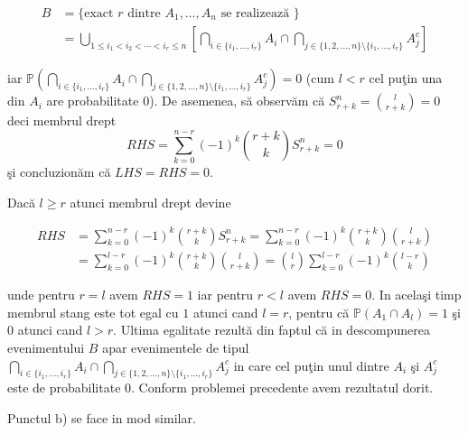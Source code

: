 \documentclass[]{article}
\def\PP{{\mathbb P}}
\begin{document}
\begin{align*}
  B &= \{\mbox{exact $r$ dintre $A_1,\dots, A_n$ se realizeaz\u a }\}\\
  &= \bigcup_{1\leq i_1<i_2<\cdots<i_r\leq n}\left[\bigcap_{i\in\{i_1,\dots,i_r\}}A_i\cap\bigcap_{j\in\{1,2,\dots,n\}\setminus\{i_1,\dots,i_r\}}A_j^c\right]
\end{align*}

iar
\(\PP\left(\bigcap_{i\in\{i_1,\dots,i_r\}}A_i\cap\bigcap_{j\in\{1,2,\dots,n\}\setminus\{i_1,\dots,i_r\}}A_j^c\right)=0\)
(cum \(l<r\) cel pu\c tin una din \(A_i\) are probabilitate \(0\)). De
asemenea, s\u a observ\u am c\u a \(S_{r+k}^{n}=\binom{l}{r+k}=0\) deci
membrul drept \[
  RHS=\displaystyle\sum_{k=0}^{n-r}(-1)^k\binom{r+k}{k}S_{r+k}^{n}=0
\] \c si concluzion\u am c\u a \(LHS=RHS=0\).

Dac\u a \(l\geq r\) atunci membrul drept devine

\begin{align*}
  RHS &= \displaystyle\sum_{k=0}^{n-r}(-1)^k\binom{r+k}{k}S_{r+k}^{n} = \displaystyle\sum_{k=0}^{n-r}(-1)^k\binom{r+k}{k}\binom{l}{r+k}\\
  &= \displaystyle\sum_{k=0}^{l-r}(-1)^k\binom{r+k}{k}\binom{l}{r+k}= \binom{l}{r}\displaystyle\sum_{k=0}^{l-r}(-1)^k\binom{l-r}{k}
\end{align*}

unde pentru \(r=l\) avem \(RHS=1\) iar pentru \(r<l\) avem \(RHS=0\). In
acela\c si timp membrul stang este tot egal cu \(1\) atunci cand
\(l=r\), pentru c\u a \(\PP(A_1\cap A_l)=1\) \c si \(0\) atunci cand
\(l>r\). Ultima egalitate rezult\u a din faptul c\u a in descompunerea
evenimentului \(B\) apar evenimentele de tipul
\(\bigcap_{i\in\{i_1,\dots,i_r\}}A_i\cap\bigcap_{j\in\{1,2,\dots,n\}\setminus\{i_1,\dots,i_r\}}A_j^c\)
in care cel pu\c tin unul dintre \(A_i\) \c si \(A_j^c\) este de
probabilitate \(0\). Conform problemei precedente avem rezultatul dorit.

Punctul b) se face in mod similar.
\end{document}
